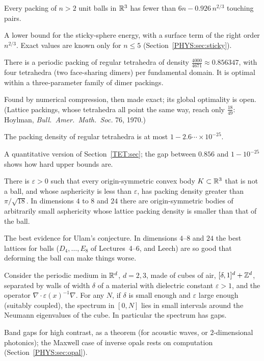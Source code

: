 \begin{theorem}\label{PHYS:thm:bezdek}
Every packing of $n>2$ unit balls in $\mathbb{R}^3$ has fewer than $6n-0.926\,n^{2/3}$ touching pairs.
\end{theorem}
\noindent A lower bound for the sticky-sphere energy, with a surface term of the right order $n^{2/3}$. Exact values
are known only for $n\le5$ (Section~\ref{PHYS:sec:sticky}).

\begin{theorem}\label{PHYS:thm:CEG}
There is a periodic packing of regular tetrahedra of density $\frac{4000}{4671}\approx0.856347$, with four
tetrahedra (two face-sharing dimers) per fundamental domain. It is optimal within a three-parameter family of
dimer packings.
\end{theorem}
\noindent Found by numerical compression, then made exact; its global optimality is open. (Lattice packings,
whose tetrahedra all point the same way, reach only $\frac{18}{49}$: Hoylman, \emph{Bull.\ Amer.\ Math.\ Soc.}
76, 1970.)

\begin{theorem}\label{PHYS:thm:GEK}
The packing density of regular tetrahedra is at most $1-2.6\cdots\times10^{-25}$.
\end{theorem}
\noindent A quantitative version of Section~\ref{TET:sec}; the gap between $0.856$ and $1-10^{-25}$ shows how
hard upper bounds are.

\begin{theorem}\label{PHYS:thm:kallus}
There is $\varepsilon>0$ such that every origin-symmetric convex body $K\subset\mathbb{R}^3$ that is not a ball, and whose
asphericity is less than $\varepsilon$, has packing density greater than $\pi/\sqrt{18}$. In dimensions $4$ to $8$ and
$24$ there are origin-symmetric bodies of arbitrarily small asphericity whose lattice packing density is
smaller than that of the ball.
\end{theorem}
\noindent The best evidence for Ulam's conjecture. In dimensions $4$--$8$ and $24$ the best lattices for balls
($D_4,\dots,E_8$ of Lectures~4--6, and Leech) are so good that deforming the ball can make things worse.

\begin{theorem}\label{PHYS:thm:FK}
Consider the periodic medium in $\mathbb{R}^d$, $d=2,3$, made of cubes of air, $[\delta,1]^d+\mathbb{Z}^d$, separated by walls of
width $\delta$ of a material with dielectric constant $\varepsilon>1$, and the operator $\nabla\cdot\varepsilon(x)^{-1}\nabla$. For any
$N$, if $\delta$ is small enough and $\varepsilon$ large enough (suitably coupled), the spectrum in $[0,N]$ lies in small
intervals around the Neumann eigenvalues of the cube. In particular the spectrum has gaps.
\end{theorem}
\noindent Band gaps for high contrast, as a theorem (for acoustic waves, or $2$-dimensional photonics); the
Maxwell case of inverse opals rests on computation (Section~\ref{PHYS:sec:opal}).

